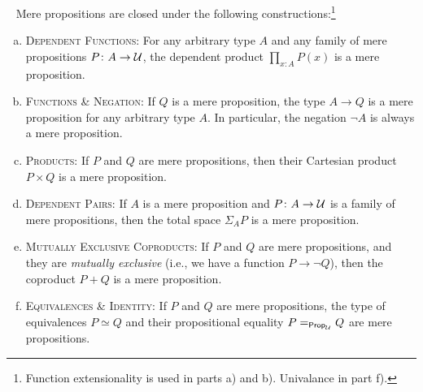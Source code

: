 \begin{thm}\fe\ \ua\label{thm:mere-propositions}
    Mere propositions are closed under the following constructions:\footnote{Function extensionality is used in parts a) and b). Univalance in part f).}
    \begin{enumerate}[a),font=\upshape]
        \item \textsc{\upshape Dependent Functions:} For any arbitrary type\/ $A$ and any family of mere propositions\/ $P\colon A\to\univ$, the dependent product\/ $\prod_{x\colon A}P(x)$ is a mere proposition.
        
        \item \textsc{\upshape Functions \& Negation:} If\/ $Q$ is a mere proposition, the type\/ $A\to Q$ is a mere proposition for any arbitrary type\/ $A$. In particular, the negation\/ $\neg A$ is always a mere proposition.
        
        \item \textsc{\upshape Products:} If\/ $P$ and\/ $Q$ are mere propositions, then their Cartesian product\/ $P\times Q$ is a mere proposition.
        
        \item \textsc{\upshape Dependent Pairs:} If\/ $A$ is a mere proposition and\/ $P\colon A\to\univ$ is a family of mere propositions, then the total space\/ $\Sigma_AP$ is a mere proposition.
        
        \item \textsc{\upshape Mutually Exclusive Coproducts:} If\/ $P$ and\/ $Q$ are mere propositions, and they are \textsl{mutually exclusive} (i.e., we have a function\/ $P\to\neg Q$), then the coproduct\/ $P+Q$ is a mere proposition.
        
        \item \textsc{\upshape Equivalences \& Identity:} If\/ $P$ and\/ $Q$ are mere propositions, the type of equivalences\/ $P\simeq Q$ and their propositional equality\/ $P\mathrel{=_{\mathsf{Prop}_\mathcal U}}Q$ are mere propositions.

    \end{enumerate}
\end{thm}

